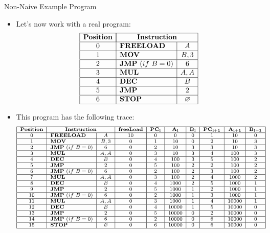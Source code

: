 \begin{frame}[allowframebreaks]{Non-Naive Example Program}
\begin{itemize}
\item Let's now work with a real program:
\[
\begin{array}{|c|l|c|}
\hline
\mathbf{Position} & \multicolumn{2}{|c|}{\mathbf{Instruction}} \\ \hline
0 & \mathbf{FREELOAD} & A \\ \hline
1 & \mathbf{MOV} & B, 3 \\ \hline
2 & \mathbf{JMP}~(if~B = 0) & 6 \\ \hline
3 & \mathbf{MUL} & A, A \\ \hline
4 & \mathbf{DEC} & B \\ \hline
5 & \mathbf{JMP} & 2 \\ \hline
6 & \mathbf{STOP} & \emptyset \\ \hline
\end{array}
\]

\item This program has the following trace:
\[
\scriptsize
\begin{array}{|c|l|c|c|c|c|c|c|c|c|}
\hline
\mathbf{Position} & \multicolumn{2}{|c|}{\mathbf{Instruction}} & \mathbf{freeLoad} & \mathbf{PC_i} & \mathbf{A_i} & \mathbf{B_i} & \mathbf{PC_{i+1}} & \mathbf{A_{i+1}} & \mathbf{B_{i+1}} \\ \hline
0 & \mathbf{FREELOAD} & A & 10 & 0 & 0 & 0 & 1 & 10 & 0 \\ \hline
1 & \mathbf{MOV} & B, 3 & 0 & 1 & 10 & 0 & 2 & 10 & 3 \\ \hline
2 & \mathbf{JMP}~(if~B = 0) & 6 & 0 & 2 & 10 & 3 & 3 & 10 & 3 \\ \hline
3 & \mathbf{MUL} & A, A & 0 & 3 & 10 & 3 & 4 & 100 & 3 \\ \hline
4 & \mathbf{DEC} & B & 0 & 4 & 100 & 3 & 5 & 100 & 2 \\ \hline
5 & \mathbf{JMP} & 2 & 0 & 5 & 100 & 2 & 2 & 100 & 2 \\ \hline
6 & \mathbf{JMP}~(if~B = 0) & 6 & 0 & 2 & 100 & 2 & 3 & 100 & 2 \\ \hline
7 & \mathbf{MUL} & A, A & 0 & 3 & 100 & 2 & 4 & 1000 & 2  \\ \hline
8 & \mathbf{DEC} & B & 0 & 4 & 1000 & 2 & 5 & 1000 & 1 \\ \hline
9 & \mathbf{JMP} & 2 & 0 & 5 & 1000 & 1 & 2 & 1000 & 1 \\ \hline
10 & \mathbf{JMP}~(if~B = 0) & 6 & 0 & 2 & 1000 & 1 & 3 & 1000 & 1 \\ \hline
11 & \mathbf{MUL} & A, A & 0 & 3 & 1000 & 1 & 4 & 10000 & 1 \\ \hline
12 & \mathbf{DEC} & B & 0 & 4 & 10000 & 1 & 5 & 10000 & 0 \\ \hline
13 & \mathbf{JMP} & 2 & 0 & 5 & 10000 & 0 & 2 & 10000 & 0 \\ \hline
14 & \mathbf{JMP}~(if~B = 0) & 6 & 0 & 2 & 10000 & 0 & 6 & 10000 & 0 \\ \hline
15 & \mathbf{STOP} & \emptyset & 0 & 6 & 10000 & 0 & 6 & 10000 & 0 \\ \hline
\end{array}
\]


\end{itemize}
\end{frame}
